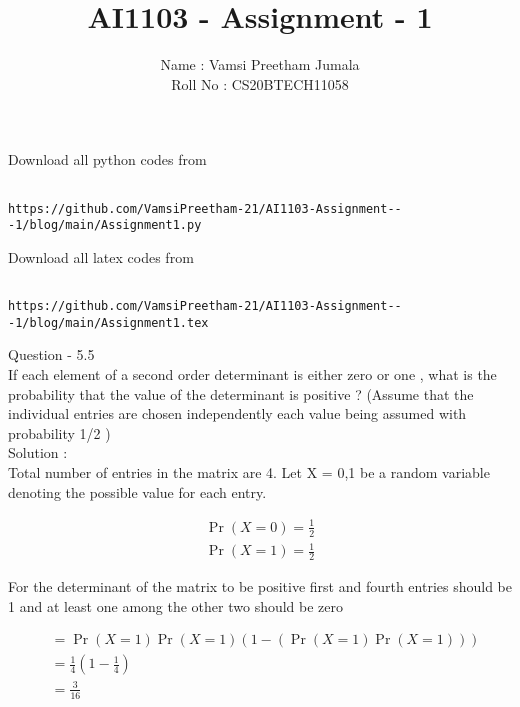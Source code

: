 \documentclass[journal,12pt,twocolumn]{IEEEtran}
\title{AI1103 - Assignment - 1}
\author{Name : Vamsi Preetham Jumala \\Roll No : CS20BTECH11058}
\begin{document}
\maketitle


Download all python codes from\\


\begin{lstlisting}

https://github.com/VamsiPreetham-21/AI1103-Assignment---1/blog/main/Assignment1.py

\end{lstlisting}


Download all latex codes from\\



\begin{lstlisting}

https://github.com/VamsiPreetham-21/AI1103-Assignment---1/blog/main/Assignment1.tex
\end{lstlisting}



Question - 5.5\\


If each element of a second order determinant is either zero or one , what is the probability that the value of the determinant is positive ? (Assume that the individual entries are chosen independently each value being assumed with probability 1/2 )\\


Solution :\\

Total number of entries in the matrix are 4.
Let X = {0,1} be a random variable denoting the possible value for each entry.

\begin{align*}
    \Pr(X=0)=\frac{1}{2}\\
    \Pr(X=1)=\frac{1}{2}
\end{align*}


For the determinant of the matrix to be positive first and fourth entries should be 1 and at least one among the other two should be zero

\begin{align*}
     &=\Pr(X=1)\Pr(X=1)(1-(\Pr(X=1)\Pr(X=1)))\\
     &=\frac{1}{4}(1-\frac{1}{4})\\
     &=\frac{3}{16}
\end{align*}
\end{document}
